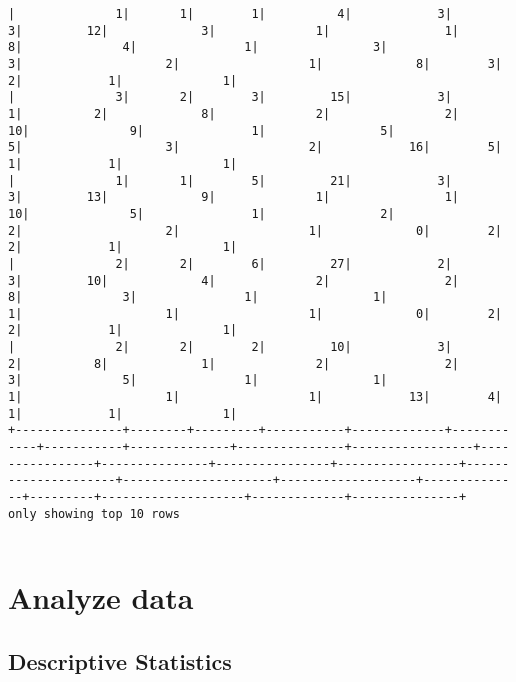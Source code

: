 \documentclass[11pt]{article}
\begin{document}
\begin{Verbatim}[commandchars=\\\{\}]
|              1|       1|        1|          4|            3|           3|         12|             3|              1|                1|               8|              4|               1|                3|                    3|                    2|                  1|             8|        3|                   2|            1|              1|
|              3|       2|        3|         15|            3|           1|          2|             8|              2|                2|              10|              9|               1|                5|                    5|                    3|                  2|            16|        5|                   1|            1|              1|
|              1|       1|        5|         21|            3|           3|         13|             9|              1|                1|              10|              5|               1|                2|                    2|                    2|                  1|             0|        2|                   2|            1|              1|
|              2|       2|        6|         27|            2|           3|         10|             4|              2|                2|               8|              3|               1|                1|                    1|                    1|                  1|             0|        2|                   2|            1|              1|
|              2|       2|        2|         10|            3|           2|          8|             1|              2|                2|               3|              5|               1|                1|                    1|                    1|                  1|            13|        4|                   1|            1|              1|
+---------------+--------+---------+-----------+-------------+------------+-----------+--------------+---------------+-----------------+----------------+---------------+----------------+-----------------+---------------------+---------------------+-------------------+--------------+---------+--------------------+-------------+---------------+
only showing top 10 rows


    \end{Verbatim}

    \hypertarget{analyze-data}{%
\section{Analyze data}\label{analyze-data}}

    \hypertarget{descriptive-statistics}{%
\subsection{Descriptive Statistics}\label{descriptive-statistics}}
\end{document}
